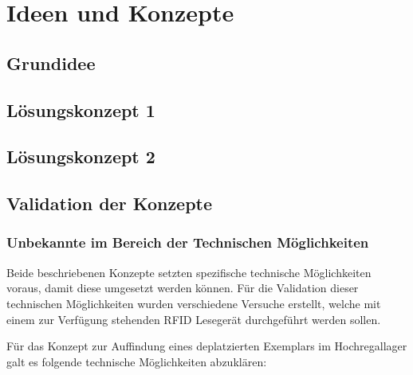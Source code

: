 \chapter{Ideen und Konzepte}

\section{Grundidee}

\section{Lösungskonzept 1}



\section{Lösungskonzept 2}



\section{Validation der Konzepte}

\subsection{Unbekannte im Bereich der Technischen Möglichkeiten}
Beide beschriebenen Konzepte setzten spezifische technische Möglichkeiten voraus, damit diese umgesetzt werden können. Für die Validation dieser technischen Möglichkeiten wurden verschiedene Versuche erstellt, welche mit einem zur Verfügung stehenden RFID Lesegerät durchgeführt werden sollen.

Für das Konzept zur Auffindung eines deplatzierten Exemplars im Hochregallager galt es folgende technische Möglichkeiten abzuklären:


